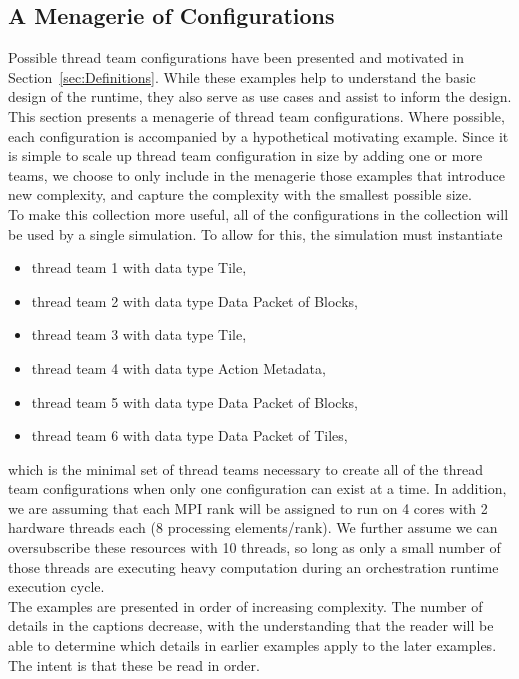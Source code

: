 \documentclass{article}
\begin{document}
\newpage
\begin{appendices}
\section{A Menagerie of Configurations}
\label{adx:ConfigMenagerie}

Possible thread team configurations have been presented and
motivated in Section~\ref{sec:Definitions}.  While these examples help to
understand the basic design of the runtime, they also serve as use cases and
assist to inform the design.  This section presents a menagerie of
thread team configurations.  Where possible,
each configuration is accompanied by a hypothetical motivating example.  Since
it is simple to scale up thread team configuration in size by adding
one or more teams, we choose to only include in the menagerie those
examples that introduce new complexity, and capture the complexity with the
smallest possible size.\\

To make this collection more useful, all of the
configurations in the collection will be used by a single simulation.  To allow
for this, the simulation must instantiate
\begin{itemize}
\item{thread team 1 with data type Tile,}
\item{thread team 2 with data type Data Packet of Blocks,}
\item{thread team 3 with data type Tile,}
\item{thread team 4 with data type Action Metadata,}
\item{thread team 5 with data type Data Packet of Blocks,}
\item{thread team 6 with data type Data Packet of Tiles,}
\end{itemize}
which is the minimal set of thread teams necessary to create all of the thread
team configurations when only one configuration can exist at a time.  In
addition, we are assuming that each MPI rank will be assigned to run on 4 cores
with 2 hardware threads each (8 processing elements/rank).  We further assume we can
oversubscribe these resources with 10 threads, so long as only a small number of
those threads are executing heavy computation during an orchestration runtime
execution cycle.\\

The examples are presented in order of increasing complexity.  The number of details
 in the captions decrease, with the understanding that the
reader will be able to determine which details in earlier examples apply to the
later examples.  The intent is that these be read in order.


\end{appendices}
\end{document}
